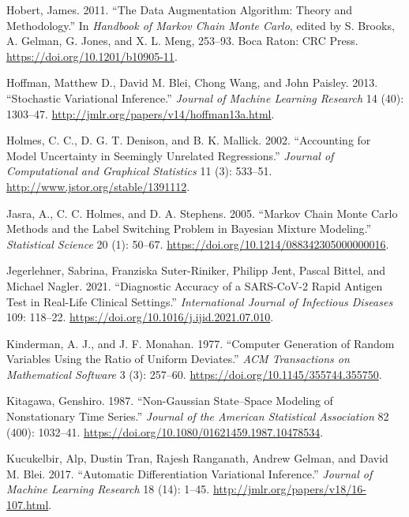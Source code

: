 \documentclass[
  11pt,
  letterpaper,
]{scrbook}
\newlength{\cslhangindent}
\newenvironment{CSLReferences}[2] %
 {\begin{list}{}{%
  \setlength{\itemindent}{0pt}
  \setlength{\leftmargin}{0pt}
  \setlength{\parsep}{0pt}
  \ifodd #1
   \setlength{\leftmargin}{\cslhangindent}
   \setlength{\itemindent}{-1\cslhangindent}
  \fi
  \setlength{\itemsep}{#2\baselineskip}}}
 {\end{list}}
\theoremstyle{definition}
\theoremstyle{plain}
\theoremstyle{plain}
\theoremstyle{plain}
\theoremstyle{definition}
\theoremstyle{definition}
\theoremstyle{remark}
\begin{document}
\begin{CSLReferences}{1}{0}
Hobert, James. 2011. {``The Data Augmentation Algorithm: Theory and
Methodology.''} In \emph{Handbook of {M}arkov Chain {M}onte {C}arlo},
edited by S. Brooks, A. Gelman, G. Jones, and X. L. Meng, 253--93. Boca
Raton: CRC Press. \url{https://doi.org/10.1201/b10905-11}.

Hoffman, Matthew D., David M. Blei, Chong Wang, and John Paisley. 2013.
{``Stochastic Variational Inference.''} \emph{Journal of Machine
Learning Research} 14 (40): 1303--47.
\url{http://jmlr.org/papers/v14/hoffman13a.html}.

Holmes, C. C., D. G. T. Denison, and B. K. Mallick. 2002. {``Accounting
for Model Uncertainty in Seemingly Unrelated Regressions.''}
\emph{Journal of Computational and Graphical Statistics} 11 (3):
533--51. \url{http://www.jstor.org/stable/1391112}.

Jasra, A., C. C. Holmes, and D. A. Stephens. 2005. {``{M}arkov Chain
{M}onte {C}arlo Methods and the Label Switching Problem in {B}ayesian
Mixture Modeling.''} \emph{Statistical Science} 20 (1): 50--67.
\url{https://doi.org/10.1214/088342305000000016}.

Jegerlehner, Sabrina, Franziska Suter-Riniker, Philipp Jent, Pascal
Bittel, and Michael Nagler. 2021. {``Diagnostic Accuracy of a
{SARS-CoV-2} Rapid Antigen Test in Real-Life Clinical Settings.''}
\emph{International Journal of Infectious Diseases} 109: 118--22.
\url{https://doi.org/10.1016/j.ijid.2021.07.010}.

Kinderman, A. J., and J. F. Monahan. 1977. {``Computer Generation of
Random Variables Using the Ratio of Uniform Deviates.''} \emph{ACM
Transactions on Mathematical Software} 3 (3): 257--60.
\url{https://doi.org/10.1145/355744.355750}.

Kitagawa, Genshiro. 1987. {``Non-{G}aussian State--Space Modeling of
Nonstationary Time Series.''} \emph{Journal of the American Statistical
Association} 82 (400): 1032--41.
\url{https://doi.org/10.1080/01621459.1987.10478534}.

Kucukelbir, Alp, Dustin Tran, Rajesh Ranganath, Andrew Gelman, and David
M. Blei. 2017. {``Automatic Differentiation Variational Inference.''}
\emph{Journal of Machine Learning Research} 18 (14): 1--45.
\url{http://jmlr.org/papers/v18/16-107.html}.


\end{CSLReferences}
\end{document}

